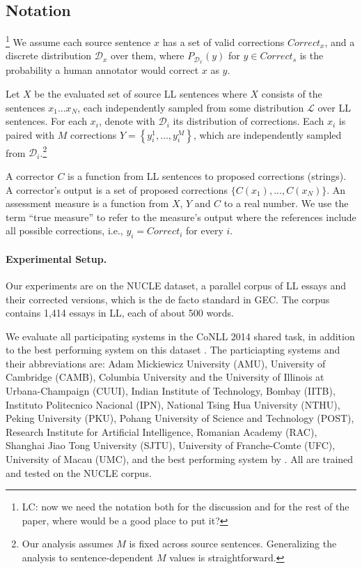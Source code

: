 \documentclass[letter,11pt]{article}
\newcommand{\lc}[1]{\footnote{\color{blue}LC: #1}}
\begin{document}
\subsection{Notation}
\lc{now we need the notation both for the discussion and for the rest of the paper, where would be a good place to put it?}
We assume each source sentence $x$ has a set of valid corrections $Correct_x$,
and a discrete distribution $\mathcal{D}_x$ over them, where $P_{\mathcal{D}_x}(y)$
for $y \in Correct_s$ is the probability a human annotator would correct $x$ as $y$.

Let $X$ be the evaluated set of source LL sentences where $X$ consists
of the sentences $x_{1}\ldots x_N$, each independently sampled from some
distribution $\mathcal{L}$ over LL sentences.
For each $x_i$, denote with $\mathcal{D}_{i}$ its distribution of corrections.
Each $x_i$ is paired with $M$ corrections $Y = \left\{y_{i}^{1},\ldots, y_{i}^{M}\right\}$,
which are independently sampled from $\mathcal{D}_{i}$.\footnote{Our analysis assumes $M$
	is fixed across source sentences. Generalizing the analysis to sentence-dependent $M$
	values is straightforward.} 


A corrector $C$ is a function from LL sentences to proposed corrections  (strings).
A corrector's output is a set of proposed corrections $\{C(x_1),...,C(x_N)\}$.
An assessment measure is a function from $X$, $Y$ and $C$ to
a real number. We use the term ``true measure'' to refer to the measure's
output where the references include all possible corrections, i.e., $y_i=Correct_i$ for
every $i$.

\paragraph{Experimental Setup.}\label{par:experimental_setup}

Our experiments are on the NUCLE dataset,
a parallel corpus of LL essays and their corrected versions,
which is the de facto standard in GEC.
The corpus contains 1,414 essays in LL, each of about 500 words.

We evaluate all participating systems in the CoNLL 2014 shared task,
in addition to the best performing system on this dataset \cite{rozovskaya2014building}.
The particiapting systems and their abbreviations are: Adam Mickiewicz University (AMU),
University of Cambridge (CAMB), Columbia University and the University of Illinois at Urbana-Champaign (CUUI),
Indian Institute of Technology, Bombay (IITB), Instituto Politecnico Nacional (IPN),
National Tsing Hua University (NTHU), Peking University (PKU), Pohang University of Science and Technology (POST),
Research Institute for Artificial Intelligence, Romanian Academy (RAC), Shanghai Jiao Tong University (SJTU),
University of Franche-Comte (UFC), University of Macau (UMC),
and the best performing system by .
All are trained and tested on the NUCLE corpus.
\end{document}
